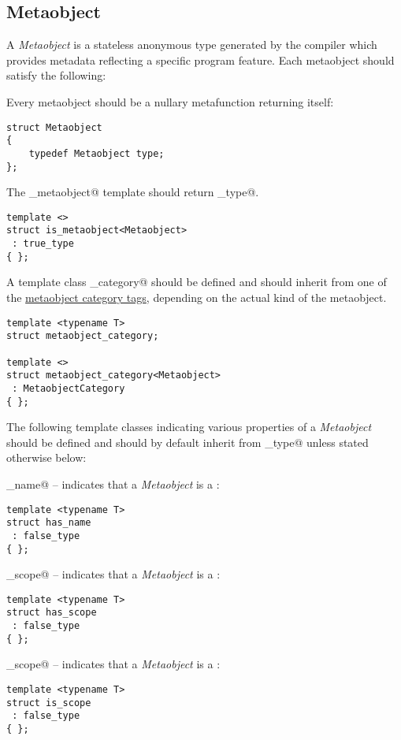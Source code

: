 \subsection{Metaobject}
\label{concept-Metaobject}

A {\em Metaobject} is a stateless anonymous type generated by the compiler which
provides metadata reflecting a specific program feature. Each metaobject
should satisfy the following:

Every metaobject should be a nullary metafunction returning itself:

\begin{lstlisting}
struct Metaobject
{
	typedef Metaobject type;
};
\end{lstlisting}

The \verb@is_metaobject@ template should return \verb@true_type@.

\begin{lstlisting}
template <>
struct is_metaobject<Metaobject>
 : true_type
{ };
\end{lstlisting}

A template class \verb@metaobject_category@ should be defined and should inherit from
one of the \hyperref[metaobject-category-tags]{metaobject category tags}, depending on
the actual kind of the metaobject.

\begin{lstlisting}
template <typename T>
struct metaobject_category;

template <>
struct metaobject_category<Metaobject>
 : MetaobjectCategory
{ };
\end{lstlisting}

The following template classes indicating various properties of a {\em Metaobject}
should be defined and should by default inherit from \verb@false_type@ unless stated
otherwise below:

\verb@has_name@ -- indicates that a {\em Metaobject} is a :
\begin{lstlisting}
template <typename T>
struct has_name
 : false_type
{ };
\end{lstlisting}

\verb@has_scope@ -- indicates that a {\em Metaobject} is a :
\begin{lstlisting}
template <typename T>
struct has_scope
 : false_type
{ };
\end{lstlisting}

\verb@is_scope@ -- indicates that a {\em Metaobject} is a :
\begin{lstlisting}
template <typename T>
struct is_scope
 : false_type
{ };
\end{lstlisting}


